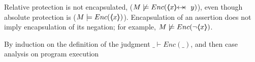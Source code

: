 \begin{note} Relative protection %
is not encapsulated, (\eg $M \not\models {\encaps{\protectedFrom{x}{y}}}$), even though    absolute protection is
(\eg $M \models {\ensuremath Enc( \ensuremath{\langle\!\!\langle x \rangle\!\!\rangle} )}$).
Encapsulation of an assertion does not imply encapsulation of its negation; 
 for example,  $M \not\models {{\ensuremath Enc( \neg\ensuremath{\langle\!\!\langle x \rangle\!\!\rangle} )}}$.
\end{note}

By induction on the definition of the judgment $\_ \vdash Enc(\_)$, and then case analysis on program execution
\completeProof

 


